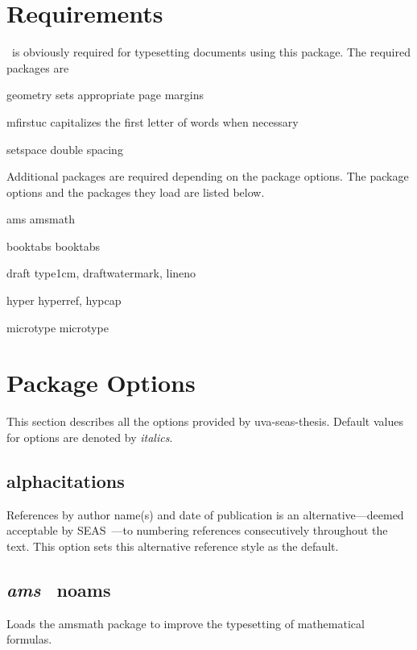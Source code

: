 \documentclass[10pt]{article}
\newcommand{\package}[1]{#1}
\newcommand{\option}[1]{#1}
\newcommand{\default}[1]{\emph{#1}}
\newcommand{\thispackage}{\package{uva-seas-thesis}}
\begin{document}
\section{Requirements}\label{section:requirements}
\LaTeXe\ is obviously required for typesetting documents using this package.
The required packages are
\begin{description*}
  \item[\package{geometry}] sets appropriate page margins
  \item[\package{mfirstuc}] capitalizes the first letter of words when necessary
  \item[\package{setspace}] double spacing
\end{description*}
Additional packages are required depending on the package options.
The package options and the packages they load are listed below.
\begin{description*}
  \item[\option{ams}] \package{amsmath}
  \item[\option{booktabs}] \package{booktabs}
  \item[\option{draft}] \package{type1cm}, \package{draftwatermark}, \package{lineno}
  \item[\option{hyper}] \package{hyperref}, \package{hypcap}
  \item[\option{microtype}] \package{microtype}
\end{description*}

\section{Package Options}\label{section:options}
This section describes all the options provided by \thispackage.
Default values for options are denoted by \default{italics}.

\subsection{\option{alphacitations}}
References by author name(s) and date of publication is an alternative---deemed acceptable by \gls{SEAS}~\cite{seas:instructions}---to numbering references consecutively throughout the text.
This option sets this alternative reference style as the default.

\subsection{\default{\option{ams}} \textbar\ \option{noams}}
Loads the \package{amsmath} package to improve the typesetting of mathematical formulas.
\end{document}
